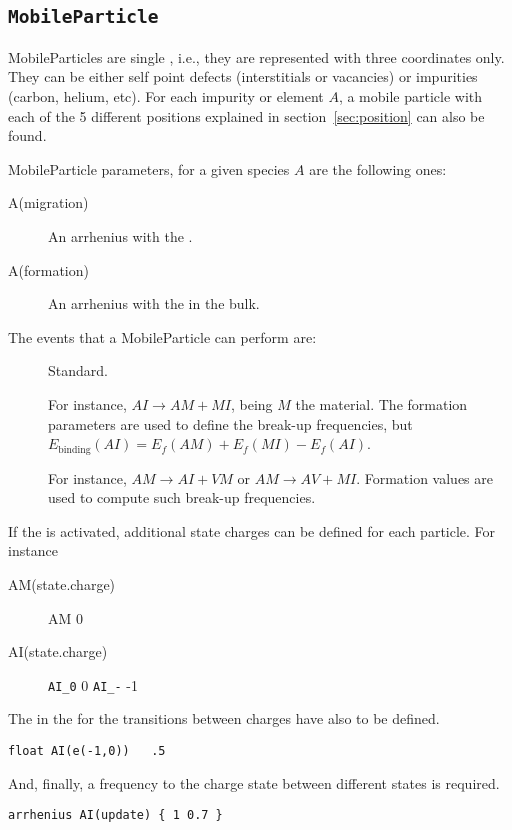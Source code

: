 \subsection{\tt MobileParticle}
MobileParticles are single , i.e., they are represented with three coordinates only. They can be either self point defects (interstitials or vacancies) or impurities (carbon, helium, etc). For each impurity or element $A$, a mobile particle with each of the 5 different positions explained in section~\ref{sec:position} can also be found. 

MobileParticle parameters, for a given species $A$ are the following ones:
\begin{description}
\item [A(migration)] An arrhenius with the .
\item [A(formation)] An arrhenius with the   in the bulk.
\end{description}

The events that a MobileParticle can perform are:
\begin{description}
\item[] Standard.
\item[] For instance, $AI \rightarrow AM + MI$, being $M$ the material. The formation parameters are used to define the break-up frequencies, but $E_\mathrm{binding}(AI) = E_f(AM) + E_f(MI) - E_f(AI)$.
\item[] For instance, $AM  \rightarrow AI +VM$ or $AM \rightarrow AV + MI$. Formation values are used to compute such break-up frequencies.
\end{description}

If the  is activated, additional state charges can be defined for each particle. For instance

\begin{description}
\item [AM(state.charge)] AM 0
\item [AI(state.charge)] \verb+AI_0+ 0 \verb+AI_-+ -1
\end{description}

The  in the  for the transitions between charges have also to be defined.

\begin{lstlisting}
float AI(e(-1,0))   .5
\end{lstlisting}

And, finally, a frequency to  the charge state between different states is required.

\begin{lstlisting}
arrhenius AI(update) { 1 0.7 }
\end{lstlisting}

